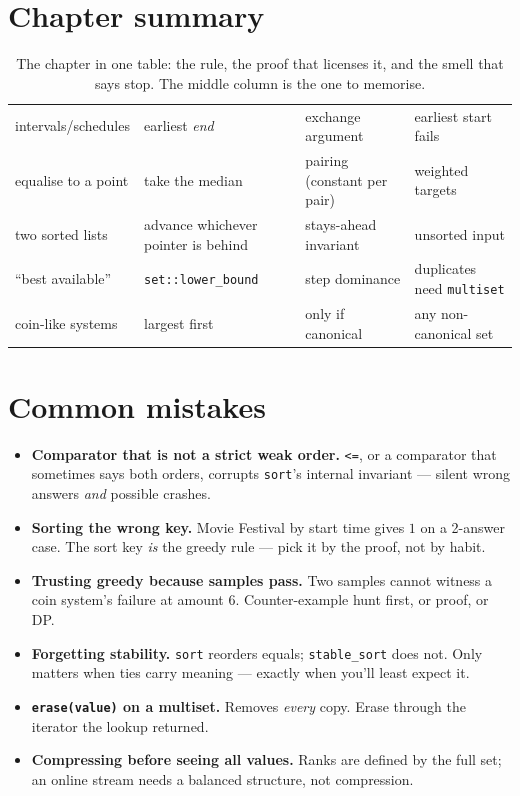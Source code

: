 \section{Chapter summary}
\begin{table}[ht]\centering
{\small\begin{tabularx}{\linewidth}{@{}lYYY@{}}
\toprule
{} &  &  & \\
\midrule
intervals/schedules & earliest \emph{end} & exchange argument & earliest start fails\\
equalise to a point & take the median & pairing (constant per pair) & weighted targets\\
two sorted lists & advance whichever pointer is behind & stays-ahead invariant & unsorted input\\
``best available'' & \texttt{set::lower\_bound} & step dominance & duplicates need \texttt{multiset}\\
coin-like systems & largest first & only if canonical & any non-canonical set\\
\bottomrule
\end{tabularx}}
\caption{The chapter in one table: the rule, the proof that licenses it,
and the smell that says stop. The middle column is the one to memorise.}
\label{tab:greedy}
\end{table}

\section{Common mistakes}
\begin{itemize}
\item \textbf{Comparator that is not a strict weak order.} \texttt{<=},
or a comparator that sometimes says both orders, corrupts
\texttt{sort}'s internal invariant --- silent wrong answers \emph{and}
possible crashes.
\item \textbf{Sorting the wrong key.} Movie Festival by start time gives
$1$ on a 2-answer case. The sort key \emph{is} the greedy rule --- pick
it by the proof, not by habit.
\item \textbf{Trusting greedy because samples pass.} Two samples cannot
witness a coin system's failure at amount $6$. Counter-example hunt
first, or proof, or DP.
\item \textbf{Forgetting stability.} \texttt{sort} reorders equals;
\texttt{stable\_sort} does not. Only matters when ties carry meaning ---
exactly when you'll least expect it.
\item \textbf{\texttt{erase(value)} on a multiset.} Removes \emph{every}
copy. Erase through the iterator the lookup returned.
\item \textbf{Compressing before seeing all values.} Ranks are defined
by the full set; an online stream needs a balanced structure, not
compression.
\end{itemize}

